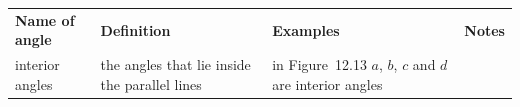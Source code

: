         \begin{center}
      \label{m39370*uid30}
    \noindent
      \tablelasttail{}
      \begin{xtabular*}{\mytablewidth}[t]{|p{3cm}|p{3cm}|p{3cm}|p{20\mystarwidth}|}\hline
                  \textbf{Name of angle}
                 &
                  \textbf{Definition}
                 &
                  \textbf{Examples}
                 &
                  \textbf{Notes}
     \tabularnewline{}
        interior angles &
        the angles that lie inside the parallel lines &
        in Figure~12.13 $a$, \begin{math}b\end{math}, \begin{math}c\end{math} and \begin{math}d\end{math} are interior angles &

\end{xtabular*}
\end{center}
